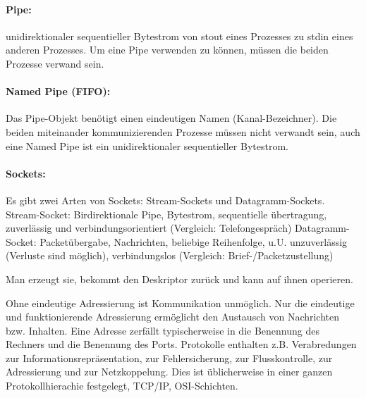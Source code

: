 \question{}
\begin{answer}

\paragraph*{Pipe:}
unidirektionaler sequentieller Bytestrom von stout eines Prozesses zu stdin eines anderen Prozesses. Um eine Pipe verwenden zu können, müssen die beiden Prozesse verwand sein.

\paragraph*{Named Pipe (FIFO):}\label{netzwerke:named-pipe}
Das Pipe-Objekt benötigt einen eindeutigen Namen (Kanal-Bezeichner). Die
beiden miteinander kommunizierenden Prozesse müssen nicht verwandt sein, auch eine Named Pipe ist ein unidirektionaler sequentieller Bytestrom.

\paragraph*{Sockets:}\label{netzwerke:sockets}
Es gibt zwei Arten von Sockets: Stream-Sockets und Datagramm-Sockets.
Stream-Socket: Birdirektionale Pipe, Bytestrom, sequentielle übertragung, zuverlässig und verbindungsorientiert (Vergleich: Telefongespräch)
Datagramm-Socket: Packetübergabe, Nachrichten, beliebige Reihenfolge, u.U. unzuverlässig (Verluste
sind möglich), verbindungslos (Vergleich: Brief-/Packetzustellung)
\end{answer}

\begin{answer}
Man erzeugt sie, bekommt den Deskriptor zurück und kann auf ihnen operieren.
\end{answer}

\begin{answer}
Ohne eindeutige Adressierung ist Kommunikation unmöglich. Nur die eindeutige und funktionierende
Adressierung ermöglicht den Austausch von Nachrichten bzw. Inhalten.
Eine Adresse zerfällt typischerweise in die Benennung des Rechners und die Benennung des Ports.
Protokolle enthalten z.B. Verabredungen zur Informationsrepräsentation, zur Fehlersicherung, zur
Flusskontrolle, zur Adressierung und zur Netzkoppelung. Dies ist üblicherweise in einer ganzen
Protokollhierachie festgelegt, TCP/IP, OSI-Schichten.
\end{answer}

